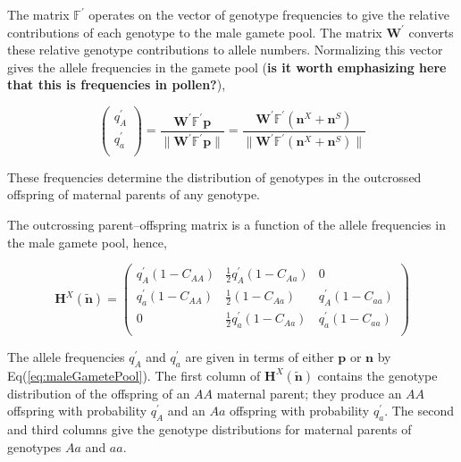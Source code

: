 \documentclass[11pt]{article}
\def\mbf#1{\mathbf{#1}}
\def\mbb#1{\mathbb{#1}}
\begin{document}
\noindent The matrix $\mbb{F}^{\prime}$ operates on the vector of genotype frequencies to give the relative contributions of each genotype to the male gamete pool. The matrix $\mbf{W}^{\prime}$ converts these relative genotype contributions to allele numbers. Normalizing this vector gives the allele frequencies in the gamete pool (\textbf{is it worth emphasizing here that this is frequencies in pollen?}),

\begin{equation} \label{eq:maleGametePool}
	\left(
		\begin{array}{c}
			q^{\prime}_{A} \\
			q^{\prime}_{a} \\
		\end{array} \right) = 
			\frac{\mbf{W}^{\prime} \mbb{F}^{\prime} \mbf{p}}{\| \mbf{W}^{\prime} \mbb{F}^{\prime} \mbf{p} \|} = 
				\frac{\mbf{W}^{\prime} \mbb{F}^{\prime} (\mbf{n}^X+ \mbf{n}^S)}{\| \mbf{W}^{\prime} \mbb{F}^{\prime} (\mbf{n}^X+ \mbf{n}^S)\|}
\end{equation}

\noindent These frequencies determine the distribution of genotypes in the outcrossed offspring of maternal parents of any genotype.

The outcrossing parent–offspring matrix is a function of the allele frequencies in the male gamete pool, hence,

\begin{equation} \label{eq:HX}
	\mbf{H}^X(\tilde{\mbf{n}}) = 
			\left(
			\begin{array}{ccc}
				q^{\prime}_{A} (1 - C_{AA}) & \frac{1}{2} q^{\prime}_{A} (1 - C_{Aa}) & 0 \\
				q^{\prime}_{a} (1 - C_{AA}) & \frac{1}{2} (1 - C_{Aa}) & q^{\prime}_{A}  (1 - C_{aa}) \\
				0 & \frac{1}{2} q^{\prime}_{a} (1 - C_{Aa}) & q^{\prime}_{a} (1 - C_{aa}) \\
			\end{array} \right)
\end{equation}

\noindent The allele frequencies $q^{\prime}_A$ and $q^{\prime}_a$ are given in terms of either $\mbf{p}$ or $\mbf{n}$ by Eq(\ref{eq:maleGametePool}). The first column of $\mbf{H}^X(\tilde{\mbf{n}})$ contains the genotype distribution of the offspring of an $AA$ maternal parent; they produce an $AA$ offspring with probability $q^{\prime}_A$ and an $Aa$ offspring with probability $q^{\prime}_a$. The second and third columns give the genotype distributions for maternal parents of genotypes $Aa$ and $aa$.
\end{document}
